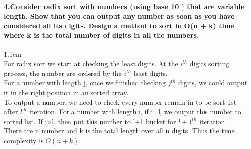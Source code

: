 \documentclass[11pt]{article}
\begin{document}
\paragraph{4.Consider radix sort with numbers (using base 10 ) that are variable length. Show that you can output any number as soon as you have considered all its digits.
Design a method to sort in O(n + k) time where k is the total number of digits in all the numbers.}
\hangindent 1.1em
\noindent
\\For radix sort we start at checking the least digits. At the $i^{th}$ digits sorting process, the number are ordered by the $i^{th}$ least digits.
\\For a number with length j, once we finished checking $j^{th}$ digits, we could output it in the right position in an sorted array.
\\To output a number, we need to check every number remain in to-be-sort list after $l^{th}$ iteration. For a number with length i, if i=l, we output this number to sorted list. If i>l, then put this number to l+1 bucket for $l+1^{th}$ iteration.
\\There are n number and k is the total length over all n digits. Thus the time complexity is  $O(n+k)$.
\end{document}
